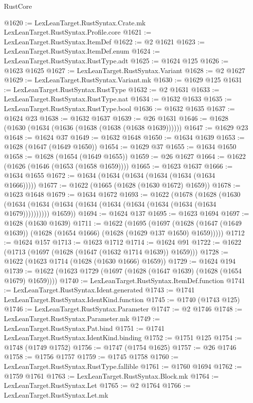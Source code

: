 \begin{lexlean}{RustCore}
\begin{coremodule}
@1620 := LexLeanTarget.RustSyntax.Crate.mk LexLeanTarget.RustSyntax.Profile.core
@1621 := LexLeanTarget.RustSyntax.ItemDef
@1622 := @2 @1621
@1623 := LexLeanTarget.RustSyntax.ItemDef.enum
@1624 := LexLeanTarget.RustSyntax.RustType.adt
@1625 := @1624 @125
@1626 := @1623 @1625
@1627 := LexLeanTarget.RustSyntax.Variant
@1628 := @2 @1627
@1629 := LexLeanTarget.RustSyntax.Variant.mk
@1630 := @1629 @125
@1631 := LexLeanTarget.RustSyntax.RustType
@1632 := @2 @1631
@1633 := LexLeanTarget.RustSyntax.RustType.nat
@1634 := @1632 @1633
@1635 := LexLeanTarget.RustSyntax.RustType.bool
@1636 := @1632 @1635
@1637 := @1624 @23
@1638 := @1632 @1637
@1639 := @26 @1631
@1646 := @1628 (@1630 (@1634 (@1636 (@1638 (@1638 (@1638 @1639))))))
@1647 := @1629 @23
@1648 := @1624 @37
@1649 := @1632 @1648
@1650 := @1634 @1639
@1653 := @1628 (@1647 (@1649 @1650))
@1654 := @1629 @37
@1655 := @1634 @1650
@1658 := @1628 (@1654 (@1649 @1655))
@1659 := @26 @1627
@1664 := @1622 (@1626 (@1646 (@1653 (@1658 @1659))))
@1665 := @1623 @1637
@1666 := @1634 @1655
@1672 := @1634 (@1634 (@1634 (@1634 (@1634 (@1634 @1666)))))
@1677 := @1622 (@1665 (@1628 (@1630 @1672) @1659))
@1678 := @1623 @1648
@1679 := @1634 @1672
@1693 := @1622
    (@1678
      (@1628
        (@1630 (@1634 (@1634 (@1634 (@1634 (@1634 (@1634 (@1634 (@1634 (@1634 @1679))))))))))
        @1659))
@1694 := @1624 @137
@1695 := @1623 @1694
@1697 := @1628 (@1630 @1639)
@1711 := @1622
    (@1695
      (@1697 (@1628 (@1647 (@1649 @1639)) (@1628 (@1654 @1666) (@1628 (@1629 @137 @1650) @1659)))))
@1712 := @1624 @157
@1713 := @1623 @1712
@1714 := @1624 @91
@1722 := @1622 (@1713 (@1697 (@1628 (@1647 (@1632 @1714 @1639)) @1659)))
@1728 := @1622 (@1623 @1714 (@1628 (@1630 @1666) @1659))
@1729 := @1624 @194
@1739 := @1622 (@1623 @1729 (@1697 (@1628 (@1647 @1639) (@1628 (@1654 @1679) @1659))))
@1740 := LexLeanTarget.RustSyntax.ItemDef.function
@1741 := LexLeanTarget.RustSyntax.Ident.generated
@1743 := @1741 LexLeanTarget.RustSyntax.IdentKind.function
@1745 := @1740 (@1743 @125)
@1746 := LexLeanTarget.RustSyntax.Parameter
@1747 := @2 @1746
@1748 := LexLeanTarget.RustSyntax.Parameter.mk
@1749 := LexLeanTarget.RustSyntax.Pat.bind
@1751 := @1741 LexLeanTarget.RustSyntax.IdentKind.binding
@1752 := @1751 @125
@1754 := @1748 (@1749 @1752)
@1756 := @1747 (@1754 @1625)
@1757 := @26 @1746
@1758 := @1756 @1757
@1759 := @1745 @1758
@1760 := LexLeanTarget.RustSyntax.RustType.fallible
@1761 := @1760 @1694
@1762 := @1759 @1761
@1763 := LexLeanTarget.RustSyntax.Block.mk
@1764 := LexLeanTarget.RustSyntax.Let
@1765 := @2 @1764
@1766 := LexLeanTarget.RustSyntax.Let.mk

\end{coremodule}
\end{lexlean}
